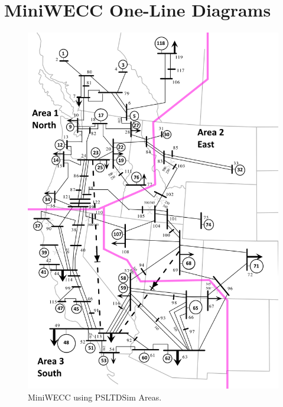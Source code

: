 \chapter{MiniWECC One-Line Diagrams} \label{sec: mw Sys}

\begin{figure}[H]
	\centering
	\footnotesize
	\includegraphics[width=.85\linewidth]{examples/miniWECC/miniWECC-split03-PSLTDSim}
	\caption{MiniWECC using PSLTDSim Areas.}
	\label{fig: mw area option 1}
\end{figure}%

